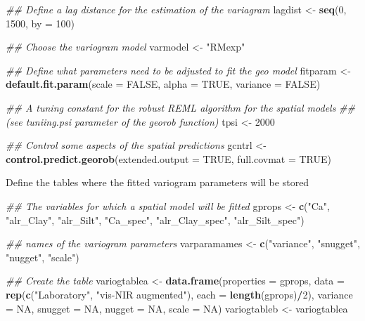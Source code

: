 \documentclass[]{book}
\newenvironment{Shaded}{\begin{snugshade}}{\end{snugshade}}
\newcommand{\CommentTok}[1]{\textcolor[rgb]{0.56,0.35,0.01}{\textit{#1}}}
\newcommand{\DataTypeTok}[1]{\textcolor[rgb]{0.13,0.29,0.53}{#1}}
\newcommand{\DecValTok}[1]{\textcolor[rgb]{0.00,0.00,0.81}{#1}}
\newcommand{\KeywordTok}[1]{\textcolor[rgb]{0.13,0.29,0.53}{\textbf{#1}}}
\newcommand{\NormalTok}[1]{#1}
\newcommand{\OperatorTok}[1]{\textcolor[rgb]{0.81,0.36,0.00}{\textbf{#1}}}
\newcommand{\OtherTok}[1]{\textcolor[rgb]{0.56,0.35,0.01}{#1}}
\newcommand{\StringTok}[1]{\textcolor[rgb]{0.31,0.60,0.02}{#1}}
\begin{document}
\begin{Shaded}
\begin{Highlighting}[]
\CommentTok{## Define a lag distance for the estimation of the variagram}
\NormalTok{lagdist <-}\StringTok{ }\KeywordTok{seq}\NormalTok{(}\DecValTok{0}\NormalTok{, }\DecValTok{1500}\NormalTok{, }\DataTypeTok{by =} \DecValTok{100}\NormalTok{)}

\CommentTok{## Choose the variogram model}
\NormalTok{varmodel <-}\StringTok{ "RMexp"}

\CommentTok{## Define what parameters need to be adjusted to fit the geo model}
\NormalTok{fitparam <-}\StringTok{ }\KeywordTok{default.fit.param}\NormalTok{(}\DataTypeTok{scale =} \OtherTok{FALSE}\NormalTok{, }\DataTypeTok{alpha =} \OtherTok{TRUE}\NormalTok{, }\DataTypeTok{variance =} \OtherTok{FALSE}\NormalTok{)}

\CommentTok{## A tuning constant for the robust REML algorithm for the spatial models}
\CommentTok{## (see tuniing.psi parameter of the georob function)}
\NormalTok{tpsi <-}\StringTok{ }\DecValTok{2000}

\CommentTok{## Control some aspects of the spatial predictions}
\NormalTok{gcntrl <-}\StringTok{ }\KeywordTok{control.predict.georob}\NormalTok{(}\DataTypeTok{extended.output =} \OtherTok{TRUE}\NormalTok{, }\DataTypeTok{full.covmat =} \OtherTok{TRUE}\NormalTok{)}
\end{Highlighting}
\end{Shaded}

Define the tables where the fitted variogram parameters will be stored

\begin{Shaded}
\begin{Highlighting}[]
\CommentTok{## The variables for which a spatial model will be fitted}
\NormalTok{gprops <-}\StringTok{ }\KeywordTok{c}\NormalTok{(}\StringTok{"Ca"}\NormalTok{, }\StringTok{"alr_Clay"}\NormalTok{, }\StringTok{"alr_Silt"}\NormalTok{, }\StringTok{"Ca_spec"}\NormalTok{, }\StringTok{"alr_Clay_spec"}\NormalTok{, }\StringTok{"alr_Silt_spec"}\NormalTok{)}

\CommentTok{## names of the variogram parameters}
\NormalTok{varparamames <-}\StringTok{ }\KeywordTok{c}\NormalTok{(}\StringTok{"variance"}\NormalTok{, }\StringTok{"snugget"}\NormalTok{, }\StringTok{"nugget"}\NormalTok{, }\StringTok{"scale"}\NormalTok{)}

\CommentTok{## Create the table}
\NormalTok{variogtablea <-}\StringTok{ }\KeywordTok{data.frame}\NormalTok{(}\DataTypeTok{properties =}\NormalTok{ gprops, }\DataTypeTok{data =} \KeywordTok{rep}\NormalTok{(}\KeywordTok{c}\NormalTok{(}\StringTok{"Laboratory"}\NormalTok{, }\StringTok{"vis-NIR augmented"}\NormalTok{), }
                    \DataTypeTok{each =} \KeywordTok{length}\NormalTok{(gprops)}\OperatorTok{/}\DecValTok{2}\NormalTok{), }\DataTypeTok{variance =} \OtherTok{NA}\NormalTok{, }\DataTypeTok{snugget =} \OtherTok{NA}\NormalTok{, }\DataTypeTok{nugget =} \OtherTok{NA}\NormalTok{, }\DataTypeTok{scale =} \OtherTok{NA}\NormalTok{)}
\NormalTok{variogtableb <-}\StringTok{ }\NormalTok{variogtablea}
\end{Highlighting}
\end{Shaded}
\end{document}
